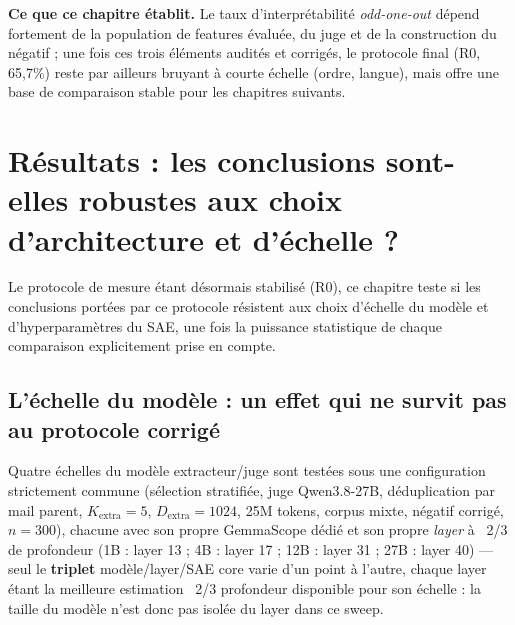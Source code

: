 \documentclass[11pt]{article}
\begin{document}
\medskip
\noindent\textbf{Ce que ce chapitre établit.} Le taux d'interprétabilité
\emph{odd-one-out} dépend fortement de la population de features évaluée, du
juge et de la construction du négatif ; une fois ces trois éléments audités
et corrigés, le protocole final (R0, 65,7\%) reste par ailleurs bruyant à
courte échelle (ordre, langue), mais offre une base de comparaison stable
pour les chapitres suivants.
\newpage
\section{Résultats : les conclusions sont-elles robustes aux choix d'architecture et d'échelle ?}
\label{sec:resultats-robustesse}

Le protocole de mesure étant désormais stabilisé (R0), ce chapitre teste si
les conclusions portées par ce protocole résistent aux choix d'échelle du
modèle et d'hyperparamètres du SAE, une fois la puissance statistique de
chaque comparaison explicitement prise en compte.

\subsection{L'échelle du modèle : un effet qui ne survit pas au protocole corrigé}
\label{subsec:model-scale}

Quatre échelles du modèle extracteur/juge sont testées sous une configuration
strictement commune (sélection stratifiée, juge Qwen3.8-27B, déduplication
par mail parent, $K_\text{extra}=5$, $D_\text{extra}=1024$, 25M tokens,
corpus mixte, négatif corrigé, $n=300$), chacune avec son propre GemmaScope
dédié et son propre \emph{layer} à \og{}~2/3 de profondeur\fg{}
\cite{formal2026splare} (1B : layer 13 ; 4B : layer 17 ; 12B : layer 31 ;
27B : layer 40) --- seul le \textbf{triplet} modèle/layer/SAE core varie
d'un point à l'autre, chaque layer étant la meilleure estimation
\og{}~2/3 profondeur\fg{} disponible pour son échelle : la taille du modèle
n'est donc pas isolée du layer dans ce sweep.
\end{document}
